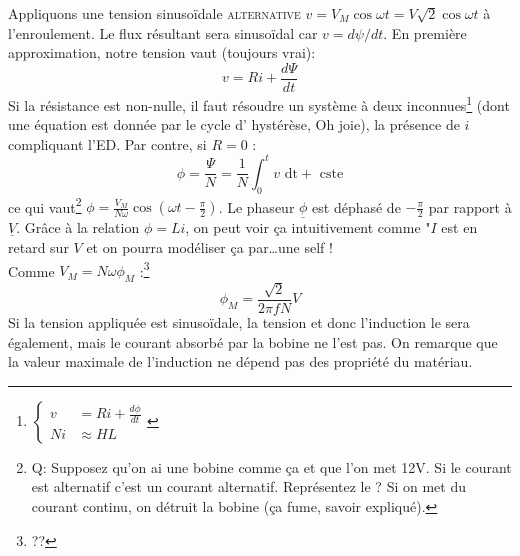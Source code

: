 		Appliquons une tension sinusoïdale \textsc{alternative} $v = V_M\cos\omega t = V
		\sqrt{2}\cos\omega t$ à l'enroulement. Le flux résultant sera 
		sinusoïdal car $v = d\psi/dt$.	En première approximation, notre 
		tension vaut (toujours vrai):
		\begin{equation}
		v = Ri + \frac{d\Psi}{dt}
		\end{equation}
		Si la résistance est non-nulle, il faut résoudre un système à 
		deux inconnues\footnote{$\left\{\begin{array}{ll}
		v &= Ri + \frac{d\phi}{dt}\\
		Ni &\approx HL
		\end{array}\right.$} (dont une équation est donnée par le cycle d'
		hystérèse, Oh joie), la présence de $i$ compliquant l'ED. Par 
		contre, si $R=0$ :
		\begin{equation}
		\phi = \frac{\Psi}{N} = \frac{1}{N}\int_0^tv\text{ dt} + \text{ 
		cste}
		\end{equation}
		ce qui vaut\footnote{Q: Supposez qu'on ai une bobine comme ça et 
		que l'on met 12V. Si le courant est alternatif c'est un courant 
		alternatif. Représentez le ? Si on met du courant continu, on détruit la bobine 
		(ça fume, savoir expliqué).} $\phi = \frac{V_M}{N\omega}\cos\left(
		\omega t - \frac{\pi}{2}\right)$. Le phaseur $\underline{\phi}$ est 
		déphasé de $-\frac{\pi}{2}$ par rapport à $\underline{V}$. Grâce à la 
		relation $\phi = Li$, on peut voir ça intuitivement comme "$I$ est 
		en retard sur $V$ et on pourra modéliser ça par\dots une self !\\
		Comme $V_M = N\omega\phi_M$ :\footnote{??}
		\begin{equation}
		\phi_M = \dfrac{\sqrt{2}}{2\pi f N}V
		\end{equation}
		Si la tension appliquée est sinusoïdale, la tension et donc 
		l'induction le sera également, mais le courant absorbé par la 
		bobine ne l'est pas. On remarque que la valeur maximale de l'induction 
		ne dépend pas des propriété du matériau.
			
